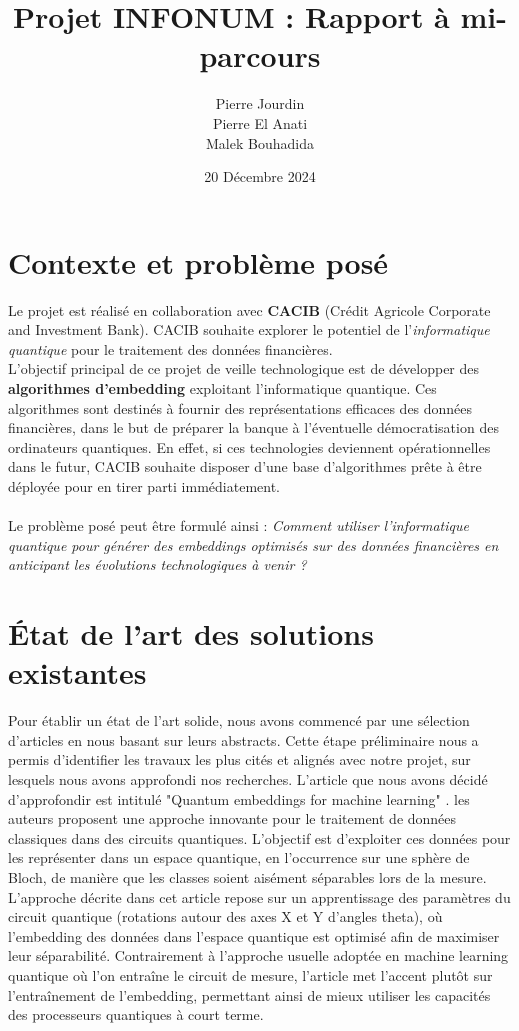 \documentclass[11pt,a4paper]{article}
\title{\textbf{Projet INFONUM : Rapport à mi-parcours}}
\author{Pierre Jourdin \\
        Pierre El Anati \\
        Malek Bouhadida}
\date{20 Décembre 2024}
\begin{document}
\maketitle
\tableofcontents
\newpage

\section{Contexte et problème posé}

Le projet est réalisé en collaboration avec \textbf{CACIB} (Crédit Agricole Corporate and Investment Bank). CACIB souhaite explorer le potentiel de l'\textit{informatique quantique} pour le traitement des données financières.
\\
L'objectif principal de ce projet de veille technologique est de développer des \textbf{algorithmes d'embedding} exploitant l'informatique quantique. Ces algorithmes sont destinés à fournir des représentations efficaces des données financières, dans le but de préparer la banque à l'éventuelle démocratisation des ordinateurs quantiques. En effet, si ces technologies deviennent opérationnelles dans le futur, CACIB souhaite disposer d'une base d'algorithmes prête à être déployée pour en tirer parti immédiatement.
\\\\
Le problème posé peut être formulé ainsi : \textit{Comment utiliser l'informatique quantique pour générer des embeddings optimisés sur des données financières en anticipant les évolutions technologiques à venir ?}


\section{État de l'art des solutions existantes}
Pour établir un état de l’art solide, nous avons commencé par une sélection d’articles en nous basant sur leurs abstracts. Cette étape préliminaire nous a permis d’identifier les travaux les plus cités et alignés avec notre projet, sur lesquels nous avons approfondi nos recherches.
L’article que nous avons décidé d’approfondir est intitulé "Quantum embeddings for machine learning" \cite{1}. les auteurs proposent une approche innovante pour le traitement de données classiques dans des circuits quantiques. L’objectif est d’exploiter ces données pour les représenter dans un espace quantique, en l’occurrence sur une sphère de Bloch, de manière que les classes soient aisément séparables lors de la mesure.
L’approche décrite dans cet article repose sur un apprentissage des paramètres du circuit quantique (rotations autour des axes X et Y d’angles theta), où l’embedding des données dans l’espace quantique est optimisé afin de maximiser leur séparabilité. Contrairement à l'approche usuelle adoptée en machine learning quantique où l'on entraîne le circuit de mesure, l’article met l’accent plutôt sur l’entraînement de l’embedding, permettant ainsi de mieux utiliser les capacités des processeurs quantiques à court terme.
\end{document}
